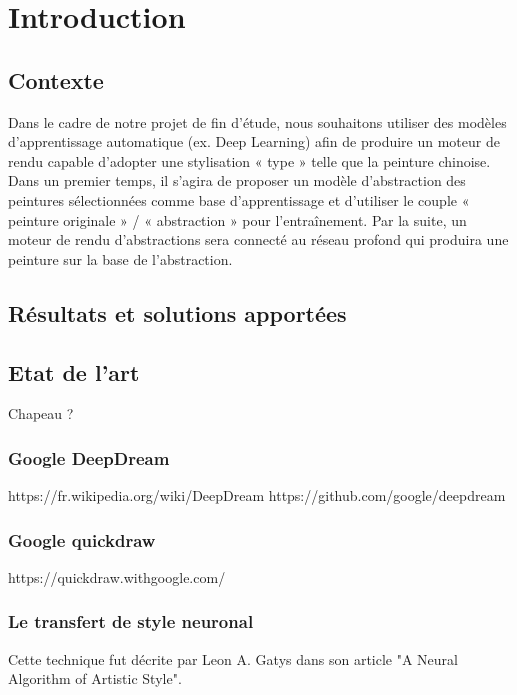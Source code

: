 \documentclass[a4paper, 12pt]{book}
\begin{document}
\mainmatter
\chapter*{Introduction}

\section{Contexte}
Dans le cadre de notre projet de fin d'étude, nous souhaitons utiliser des modèles d’apprentissage automatique (ex. Deep Learning) afin de produire un moteur de rendu capable d’adopter une stylisation « type » telle que la peinture chinoise. Dans un premier temps, il s’agira de proposer un modèle d’abstraction des peintures sélectionnées comme base d’apprentissage et d’utiliser le couple « peinture originale » / « abstraction » pour l’entraînement. Par la suite, un moteur de rendu d’abstractions sera connecté au réseau profond qui produira une peinture sur la base de l’abstraction.

\section{Résultats et solutions apportées}


\section{Etat de l'art}
Chapeau ?

\subsection{Google DeepDream}
https://fr.wikipedia.org/wiki/DeepDream
https://github.com/google/deepdream

\subsection{Google quickdraw}
https://quickdraw.withgoogle.com/

\subsection{Le transfert de style neuronal}

Cette technique fut décrite par Leon A. Gatys dans son article "A Neural Algorithm of Artistic Style".~\cite{DBLP:journals/corr/GatysEB15a}
\end{document}

